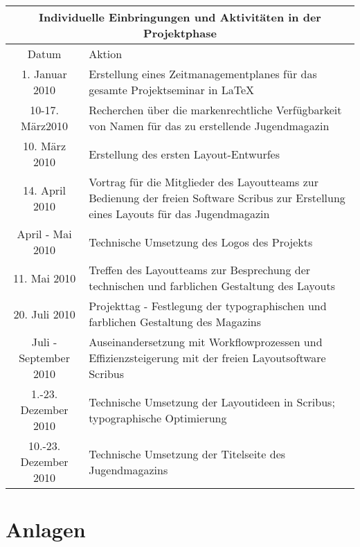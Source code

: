 \documentclass[a4paper,12pt,oneside]{scrbook}
\begin{document}
\begin{tabular}{cp{12cm}} \hline
\toprule
\multicolumn{2}{c}{\large Individuelle Einbringungen und Aktivitäten in der Projektphase} \\\midrule
Datum & Aktion \\ \hline
1. Januar 2010 & Erstellung eines Zeitmanagementplanes für das gesamte Projektseminar in \LaTeX\\
10-17. März2010 & Recherchen über die markenrechtliche Verfügbarkeit von Namen für das zu erstellende Jugendmagazin\\
10. März 2010 & Erstellung des ersten Layout-Entwurfes\\
14. April 2010 & Vortrag für die Mitglieder des Layoutteams zur Bedienung der freien Software Scribus zur Erstellung eines Layouts für das Jugendmagazin\\
April - Mai 2010 & Technische Umsetzung des Logos des Projekts\\
11. Mai 2010 & Treffen des Layoutteams zur Besprechung der technischen und farblichen Gestaltung des Layouts\\
20. Juli 2010 & Projekttag - Festlegung der typographischen und farblichen Gestaltung des Magazins\\
Juli - September 2010 & Auseinandersetzung mit Workflowprozessen und Effizienzsteigerung mit der freien Layoutsoftware Scribus\\
1.-23. Dezember 2010 & Technische Umsetzung der Layoutideen in Scribus; typographische Optimierung\\
10.-23. Dezember 2010 & Technische Umsetzung der Titelseite des Jugendmagazins\\
\bottomrule 
\end{tabular}
\chapter{Anlagen}











\end{document}

